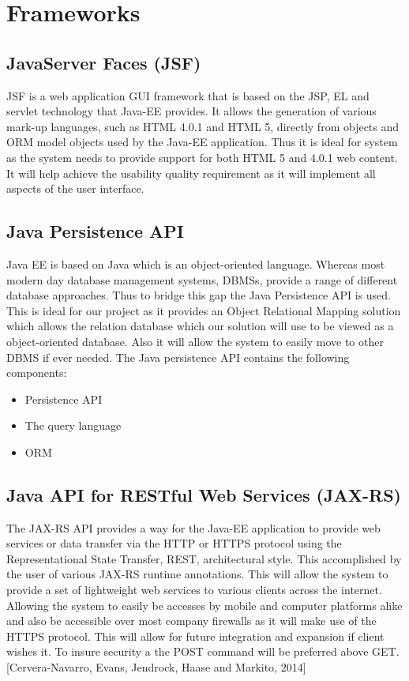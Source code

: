 \documentclass[12pt]{article}
\begin{document}
\section{Frameworks}
\subsection{JavaServer Faces (JSF)}
JSF is a web application GUI framework that is based on the JSP, EL and servlet technology that Java-EE provides. It allows the generation of various mark-up languages, such as HTML 4.0.1 and HTML 5, directly from objects and ORM model objects used by the Java-EE application. Thus it is ideal for system as the system needs to provide support for both HTML 5 and 4.0.1 web content.\\
It will help achieve the usability quality requirement as it will implement all aspects of the user interface.

\subsection{Java Persistence API}
Java EE is based on Java which is an object-oriented language. Whereas most modern day database management systems, DBMSs, provide a range of different database approaches. Thus to bridge this gap the Java Persistence API is used. This is ideal for our project as it provides an Object Relational Mapping solution which allows the relation database which our solution will use to be viewed as a object-oriented database. Also it will allow the system to easily move to other DBMS if ever needed. The Java persistence API contains the following components:  
\begin{itemize}
\item Persistence API
\item The query language
\item ORM
\end{itemize}

\subsection{Java API for RESTful Web Services (JAX-RS)}
The JAX-RS API provides a way for the Java-EE application to provide web services or data transfer via the HTTP or HTTPS protocol using the Representational State Transfer, REST, architectural style. This accomplished by the user of various JAX-RS runtime annotations. This will allow the system to provide a set of lightweight web services to various clients across the internet. Allowing the system to easily be accesses by mobile and computer platforms alike and also be accessible over most company firewalls as it will make use of the HTTPS protocol. This will allow for future integration and expansion if client wishes it. To insure security a the POST command will be preferred above GET.[Cervera-Navarro, Evans, Jendrock, Haase and Markito, 2014]
\end{document}
